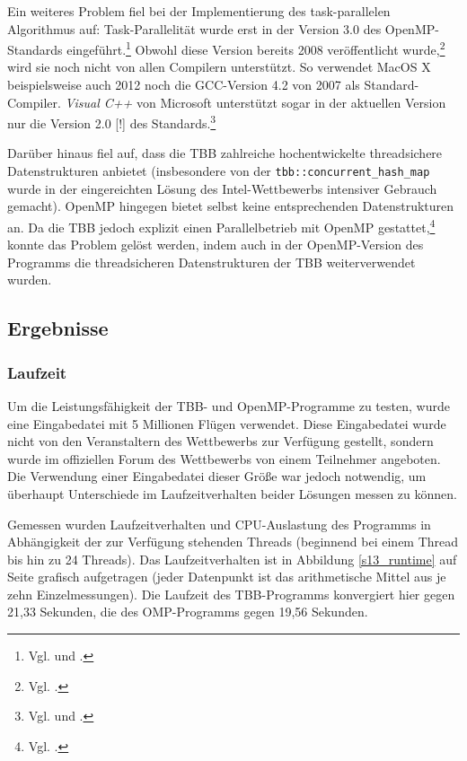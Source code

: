 \documentclass[11pt]{scrartcl}
\begin{document}
Ein weiteres Problem fiel bei der Implementierung des task-parallelen Algorithmus auf: Task-Parallelität wurde erst in
der Version 3.0 des OpenMP-Standards eingeführt.\footnote{Vgl. \cite[S.~134]{openmp08} und
\cite[S.~406ff]{ayguade_design_2009}.} Obwohl diese Version bereits 2008 veröffentlicht wurde,\footnote{Vgl.
\cite{openmp.org_openmp_2012}.} wird sie noch nicht von allen Compilern unterstützt. So verwendet MacOS X
beispielsweise auch 2012 noch die GCC-Version 4.2 von 2007 als Standard-Compiler. \emph{Visual C++} von Microsoft
unterstützt sogar in der aktuellen Version nur die Version 2.0 [!] des Standards.\footnote{Vgl.
\cite{openmp.org_openmp_2012-2} und
\cite{microsoft_openmp_2012}.}

Darüber hinaus fiel auf, dass die TBB zahlreiche hochentwickelte threadsichere Datenstrukturen anbietet (insbesondere
von der \texttt{tbb::concurrent\_hash\_map} wurde in der eingereichten Lösung des Intel-Wettbewerbs intensiver Gebrauch
gemacht). OpenMP hingegen bietet selbst keine entsprechenden Datenstrukturen an. Da die TBB jedoch explizit einen
Parallelbetrieb mit OpenMP gestattet,\footnote{Vgl. \cite{intel_mixing_2012}.} konnte das Problem gelöst werden, indem
auch in der OpenMP-Version des Programms die threadsicheren Datenstrukturen der TBB weiterverwendet wurden.

\subsection{Ergebnisse}

\subsubsection{Laufzeit}

Um die Leistungsfähigkeit der TBB- und OpenMP-Programme zu testen, wurde eine Eingabedatei mit 5 Millionen Flügen verwendet. Diese Eingabedatei wurde nicht von den Veranstaltern des Wettbewerbs zur Verfügung gestellt, sondern wurde im offiziellen Forum des Wettbewerbs von einem Teilnehmer angeboten. Die Verwendung einer Eingabedatei dieser Größe war jedoch notwendig, um überhaupt Unterschiede im Laufzeitverhalten beider Lösungen messen zu können.

Gemessen wurden Laufzeitverhalten und CPU-Auslastung des Programms in Abhängigkeit der zur Verfügung stehenden Threads (beginnend bei einem Thread bis hin zu 24 Threads). Das Laufzeitverhalten ist in Abbildung \ref{s13_runtime} auf Seite \pageref{s13_runtime} grafisch aufgetragen (jeder Datenpunkt ist das arithmetische Mittel aus je zehn Einzelmessungen). Die Laufzeit des TBB-Programms konvergiert hier gegen 21,33 Sekunden, die des OMP-Programms gegen 19,56 Sekunden.
\end{document}
